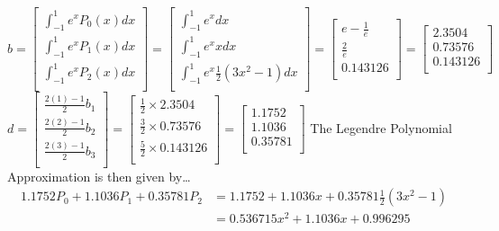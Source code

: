 \documentclass[10pt]{jhwhw}
\begin{document}
	$b = 
	\left[\begin{array}{c}
		\int_{-1}^1 e^x P_0(x) dx \\
		\int_{-1}^1 e^x P_1(x) dx \\
		\int_{-1}^1 e^x P_2(x) dx \\
	\end{array} \right] =
	\left[\begin{array}{c}
		\int_{-1}^1 e^x dx \\
		\int_{-1}^1 e^x x dx \\
		\int_{-1}^1 e^x \frac{1}{2}(3x^2-1) dx \\
	\end{array} \right] =
	\left[\begin{array}{c}
		e - \frac{1}{e} \\
		\frac{2}{e} \\
		0.143126 \\
	\end{array} \right] =
	\left[\begin{array}{c}
		2.3504 \\
		0.73576 \\
		0.143126 \\
	\end{array} \right]
	$
	\bigbreak
	$d = 
	\left[\begin{array}{c}
		\frac{2(1)-1}{2}b_1 \\
		\frac{2(2)-1}{2}b_2 \\
		\frac{2(3)-1}{2}b_3 \\
	\end{array} \right] =
	\left[\begin{array}{c}
		\frac{1}{2}\times 2.3504 \\
		\frac{3}{2}\times 0.73576 \\
		\frac{5}{2}\times 0.143126 \\
	\end{array} \right] =
	\left[\begin{array}{c}
		1.1752 \\
		1.1036 \\
		0.35781 \\
	\end{array} \right]
	$
	\bigbreak
	The Legendre Polynomial Approximation is then given by\ldots
	\begin{align*}
		1.1752P_0 + 1.1036P_1 + 0.35781P_2 &=
		1.1752 + 1.1036x + 0.35781\frac{1}{2}(3x^2-1)  \\
		&= 0.536715x^2 + 1.1036x + 0.996295 \\
	\end{align*}
\end{document}

